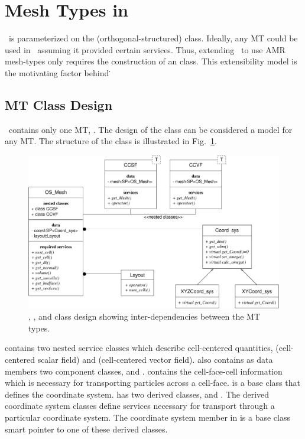 
\section{Mesh Types in \imctest}

\imctest\ is parameterized on the  (orthogonal-structured) 
class.  Ideally, any MT could be used in \imctest\ assuming it provided 
certain services.  Thus, extending \imctest\ to use AMR mesh-types only 
requires the construction of an  class.  This
extensibility model is the motivating factor behind \draco\.

\subsection{MT Class Design}

\imctest\ contains only one MT, .  The design of the
 class can be considered a model for any MT.  The
structure of the  class is illustrated in
Fig.~\ref{fig:os_mesh}.
\begin{figure}
\centerline{
\includegraphics[width=6in]{os_mesh.eps}}
\caption{, , and  class
  design showing inter-dependencies between the MT types.}
\label{fig:os_mesh}
\end{figure}
 contains two nested service classes which describe
cell-centered quantities,  (cell-centered scalar field) and
 (cell-centered vector field).   also
contains as data members two component classes,  and
.   contains the cell-face-cell
information which is necessary for transporting particles across a
cell-face.   is a base class that defines the
coordinate system.   has two derived classes,
 and .  The derived coordinate
system classes define services necessary for transport through a
particular coordinate system.  The coordinate system member in
 is a base class smart pointer to one of these derived
classes.

